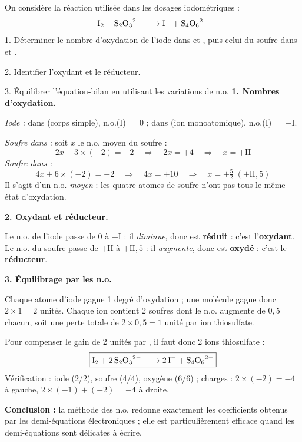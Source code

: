 \documentclass[11pt]{article}
\begin{document}
\begin{exoresolu}
On considère la réaction utilisée dans les dosages iodométriques :
\[ \ce{I2 + S2O3^{2-} -> I- + S4O6^{2-}} \]
1. Déterminer le nombre d'oxydation de l'iode dans  et , puis celui du soufre dans  et .\par
2. Identifier l'oxydant et le réducteur.\par
3. Équilibrer l'équation-bilan en utilisant les variations de n.o.
\tcblower
\textbf{1. Nombres d'oxydation.}\par
\emph{Iode :} dans  (corps simple), n.o.(I) $= 0$ ; dans  (ion monoatomique), n.o.(I) $= -\mathrm{I}$.\par
\emph{Soufre dans  :} soit $x$ le n.o. moyen du soufre :
\[ 2x + 3 \times (-2) = -2 \quad \Longrightarrow \quad 2x = +4 \quad \Longrightarrow \quad x = +\mathrm{II} \]
\emph{Soufre dans  :}
\[ 4x + 6 \times (-2) = -2 \quad \Longrightarrow \quad 4x = +10 \quad \Longrightarrow \quad x = +\tfrac{5}{2} \; (+\mathrm{II{,}5}) \]
Il s'agit d'un n.o. \emph{moyen} : les quatre atomes de soufre n'ont pas tous le même état d'oxydation.\par
\textbf{2. Oxydant et réducteur.}\par
Le n.o. de l'iode passe de $0$ à $-\mathrm{I}$ : il \emph{diminue}, donc  est \textbf{réduit} : c'est l'\textbf{oxydant}. Le n.o. du soufre passe de $+\mathrm{II}$ à $+\mathrm{II{,}5}$ : il \emph{augmente}, donc  est \textbf{oxydé} : c'est le \textbf{réducteur}.\par
\textbf{3. Équilibrage par les n.o.}\par
Chaque atome d'iode gagne 1 degré d'oxydation ; une molécule  gagne donc $2 \times 1 = 2$ unités. Chaque ion  contient 2 soufres dont le n.o. augmente de $0{,}5$ chacun, soit une perte totale de $2 \times 0{,}5 = 1$ unité par ion thiosulfate.\par
Pour compenser le gain de 2 unités par , il faut donc 2 ions thiosulfate :
\[ \boxed{\ce{I2 + 2S2O3^{2-} -> 2I- + S4O6^{2-}}} \]
Vérification : iode (2/2), soufre (4/4), oxygène (6/6) ; charges : $2 \times (-2) = -4$ à gauche, $2 \times (-1) + (-2) = -4$ à droite.\par
\textbf{Conclusion :} la méthode des n.o. redonne exactement les coefficients obtenus par les demi-équations électroniques ; elle est particulièrement efficace quand les demi-équations sont délicates à écrire.
\end{exoresolu}
\end{document}
